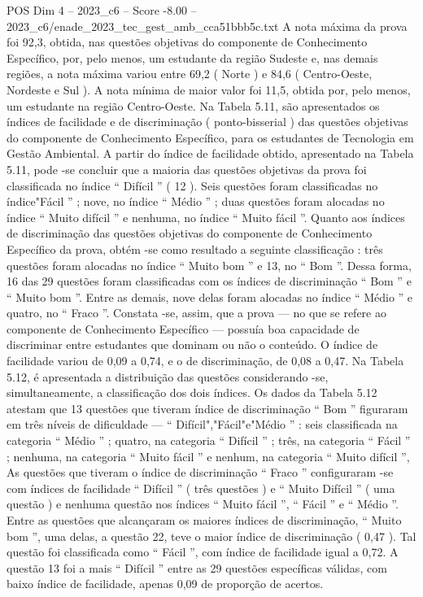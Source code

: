\begin{textsample}{POS Dim 4 – 2023\_c6 – Score -8.00 – 2023\_c6/enade\_2023\_tec\_gest\_amb\_cca51bbb5c.txt}
A nota máxima da prova foi 92,3, obtida, nas questões objetivas do componente de Conhecimento Específico, por, pelo menos, um estudante da região Sudeste e, nas demais regiões, a nota máxima variou entre 69,2 ( Norte ) e 84,6 ( Centro-Oeste, Nordeste e Sul ).
A nota mínima de maior valor foi 11,5, obtida por, pelo menos, um estudante na região Centro-Oeste.
Na Tabela 5.11, são apresentados os índices de facilidade e de discriminação ( ponto-bisserial ) das questões objetivas do componente de Conhecimento Específico, para os estudantes de Tecnologia em Gestão Ambiental.
A partir do índice de facilidade obtido, apresentado na Tabela 5.11, pode -se concluir que a maioria das questões objetivas da prova foi classificada no índice “ Difícil ” ( 12 ).
Seis questões foram classificadas no índice"Fácil ” ; nove, no índice “ Médio ” ; duas questões foram alocadas no índice “ Muito difícil ” e nenhuma, no índice “ Muito fácil ”.
Quanto aos índices de discriminação das questões objetivas do componente de Conhecimento Específico da prova, obtém -se como resultado a seguinte classificação : três questões foram alocadas no índice “ Muito bom ” e 13, no “ Bom ”.
Dessa forma, 16 das 29 questões foram classificadas com os índices de discriminação “ Bom ” e “ Muito bom ”.
Entre as demais, nove delas foram alocadas no índice “ Médio ” e quatro, no “ Fraco ”.
Constata -se, assim, que a prova — no que se refere ao componente de Conhecimento Específico — possuía boa capacidade de discriminar entre estudantes que dominam ou não o conteúdo.
O índice de facilidade variou de 0,09 a 0,74, e o de discriminação, de 0,08 a 0,47.
Na Tabela 5.12, é apresentada a distribuição das questões considerando -se, simultaneamente, a classificação dos dois índices.
Os dados da Tabela 5.12 atestam que 13 questões que tiveram índice de discriminação “ Bom ” figuraram em três níveis de dificuldade — “ Difícil","Fácil"e"Médio ” : seis classificada na categoria “ Médio ” ; quatro, na categoria “ Difícil ” ; três, na categoria “ Fácil ” ; nenhuma, na categoria “ Muito fácil ” e nenhum, na categoria “ Muito difícil ”, As questões que tiveram o índice de discriminação “ Fraco ” configuraram -se com índices de facilidade “ Difícil ” ( três questões ) e “ Muito Difícil ” ( uma questão ) e nenhuma questão nos índices “ Muito fácil ”, “ Fácil ” e “ Médio ”.
Entre as questões que alcançaram os maiores índices de discriminação, “ Muito bom ”, uma delas, a questão 22, teve o maior índice de discriminação ( 0,47 ).
Tal questão foi classificada como “ Fácil ”, com índice de facilidade igual a 0,72.
A questão 13 foi a mais “ Difícil ” entre as 29 questões específicas válidas, com baixo índice de facilidade, apenas 0,09 de proporção de acertos.

\end{textsample}
